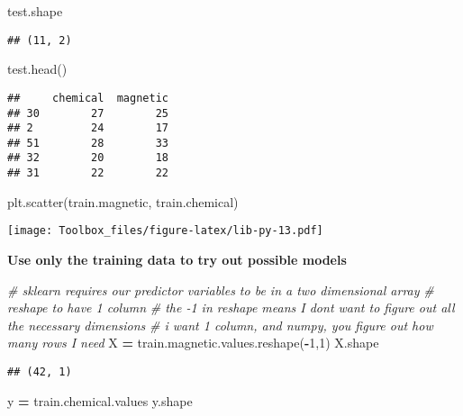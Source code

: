 \documentclass[
]{book}
\newenvironment{Shaded}{\begin{snugshade}}{\end{snugshade}}
\newcommand{\CommentTok}[1]{\textcolor[rgb]{0.56,0.35,0.01}{\textit{#1}}}
\newcommand{\DecValTok}[1]{\textcolor[rgb]{0.00,0.00,0.81}{#1}}
\newcommand{\NormalTok}[1]{#1}
\newcommand{\OperatorTok}[1]{\textcolor[rgb]{0.81,0.36,0.00}{\textbf{#1}}}
\begin{document}
\begin{Shaded}
\begin{Highlighting}[]
\NormalTok{test.shape}
\end{Highlighting}
\end{Shaded}

\begin{verbatim}
## (11, 2)
\end{verbatim}

\begin{Shaded}
\begin{Highlighting}[]
\NormalTok{test.head()}
\end{Highlighting}
\end{Shaded}

\begin{verbatim}
##     chemical  magnetic
## 30        27        25
## 2         24        17
## 51        28        33
## 32        20        18
## 31        22        22
\end{verbatim}

\begin{Shaded}
\begin{Highlighting}[]
\NormalTok{plt.scatter(train.magnetic, train.chemical)}
\end{Highlighting}
\end{Shaded}

\texttt{[image: Toolbox\_files/figure-latex/lib-py-13.pdf]}

\textbf{Use only the training data to try out possible models}

\begin{Shaded}
\begin{Highlighting}[]
\CommentTok{\# sklearn requires our predictor variables to be in a two dimensional array}
\CommentTok{\# reshape to have 1 column}
\CommentTok{\# the {-}1 in reshape means I don\textquotesingle{}t want to figure out all the necessary dimensions}
\CommentTok{\# i want 1 column, and numpy, you figure out how many rows I need}
\NormalTok{X }\OperatorTok{=}\NormalTok{ train.magnetic.values.reshape(}\OperatorTok{{-}}\DecValTok{1}\NormalTok{,}\DecValTok{1}\NormalTok{)}
\NormalTok{X.shape}
\end{Highlighting}
\end{Shaded}

\begin{verbatim}
## (42, 1)
\end{verbatim}

\begin{Shaded}
\begin{Highlighting}[]
\NormalTok{y }\OperatorTok{=}\NormalTok{ train.chemical.values}
\NormalTok{y.shape}
\end{Highlighting}
\end{Shaded}
\end{document}
